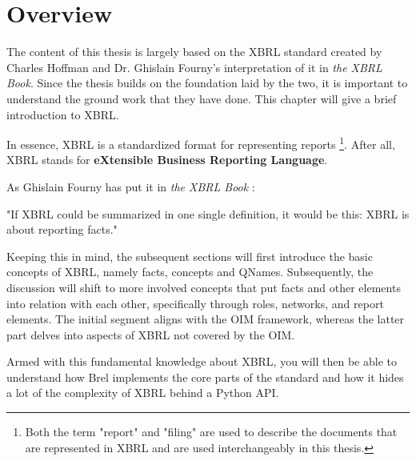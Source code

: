 \section{Overview}

The content of this thesis is largely based on the XBRL standard\cite{xbrl} created by Charles Hoffman and Dr. Ghislain Fourny's interpretation of it in \textit{the XBRL Book}\cite{fourny2023xbrl}.
Since the thesis builds on the foundation laid by the two, it is important to understand the ground work that they have done.
This chapter will give a brief introduction to XBRL.

In essence, XBRL is a standardized format for representing reports
\footnote{Both the term "report" and "filing" are used to describe the documents that are represented in XBRL and are used interchangeably in this thesis.}.
After all, XBRL stands for \textbf{eXtensible Business Reporting Language}.\cite{xbrl}

As Ghislain Fourny has put it in \textit{the XBRL Book} \cite{fourny2023xbrl}:
\begin{displayquote}
    "If XBRL could be summarized in one single definition, it would be this:
    XBRL is about reporting facts."
\end{displayquote}

Keeping this in mind, the subsequent sections will first introduce the basic concepts of XBRL, namely facts, concepts and QNames.
Subsequently, the discussion will shift to more involved concepts that put facts and other elements into relation with each other, 
specifically through roles, networks, and report elements.
The initial segment aligns with the OIM framework, whereas the latter part delves into aspects of XBRL not covered by the OIM.

Armed with this fundamental knowledge about XBRL, 
you will then be able to understand how Brel implements the core parts of the standard and how it hides a lot of the complexity of XBRL behind a Python API.


